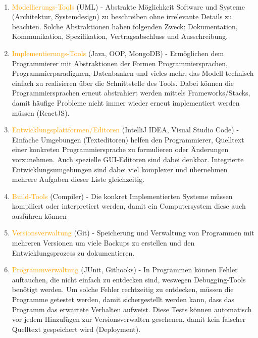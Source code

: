         \begin{loesung}\:
            \\[-.7cm]\begin{enumerate}
                \setlength\itemsep{0.1px}
                \item \textcolor{Orange}{Modellierungs-Tools} (UML) - Abstrakte Möglichkeit Software und Systeme (Architektur, Systemdesign) zu beschreiben ohne irrelevante Details zu beachten. Solche Abstraktionen haben folgenden Zweck: Dokumentation, Kommunikation, Spezifikation, Vertragsabschluss und Ausschreibung.
                \item \textcolor{Orange}{Implementierungs-Tools} (Java, OOP, MongoDB) - Ermöglichen dem Programmierer mit Abstraktionen der Formen Programmiersprachen, Programmierparadigmen, Datenbanken und vieles mehr, das Modell technisch einfach zu realisieren über die Schnittstelle des Tools. Dabei können die Programmiersprachen erneut abstrahiert werden mittels Frameworks/Stacks, damit häufige Probleme nicht immer wieder erneut implementiert werden müssen (ReactJS).
                \item \textcolor{Orange}{Entwicklungsplattformen/Editoren} (IntelliJ IDEA, Visual Studio Code) - Einfache Umgebungen (Texteditoren) helfen den Programmierer, Quelltext einer konkreten Programmiersprache zu formulieren oder Änderungen vorzunehmen. Auch spezielle GUI-Editoren sind dabei denkbar. Integrierte Entwicklungsumgebungen sind dabei viel komplexer und übernehmen mehrere Aufgaben dieser Liste gleichzeitig.
                \item \textcolor{Orange}{Build-Tools} (Compiler) - Die konkret Implementierten Systeme müssen kompiliert oder interpretiert werden, damit ein Computersystem diese auch ausführen können
                \item \textcolor{Orange}{Versionsverwaltung} (Git) - Speicherung und Verwaltung von Programmen mit mehreren Versionen um viele Backups zu erstellen und den Entwicklungsprozess zu dokumentieren.
                \item \textcolor{Orange}{Programmverwaltung} (JUnit, Githooks) - In Programmen können Fehler auftauchen, die nicht einfach zu entdecken sind, weswegen Debugging-Tools benötigt werden. Um solche Fehler rechtzeitig zu entdecken, müssen die Programme getestet werden, damit sichergestellt werden kann, dass das Programm das erwartete Verhalten aufweist. Diese Tests können automatisch vor jedem Hinzufügen zur Versionsverwalten gesehenen, damit kein falscher Quelltext gespeichert wird (Deployment).
            \end{enumerate}
        \end{loesung}
	
